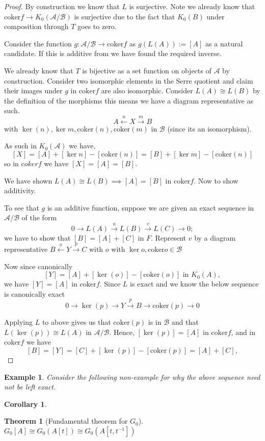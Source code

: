 \documentclass[12pt]{article}
\numberwithin{equation}{section}
\newcommand{\coker}{{\mathrm{coker}}}
\newcounter{dummy} \numberwithin{dummy}{section}
\newtheorem{theorem}[dummy]{Theorem}
\newtheorem{corollary}[dummy]{Corollary}
\newtheorem{example}[dummy]{Example}
\begin{document}
	\begin{proof}
		By construction we know that $L$ is surjective.
		Note we already know that $\mathrm{coker} f \to  K_0(\mathcal{A/B})$ is surjective due to the fact that $K_0(B) $ under composition through $T$ goes to zero.
		
		Consider the function $g:\mathcal{A/B} \to \mathrm{coker}f$ as $g(L(A)):=[A]$ as a natural candidate. If this is additive from we have found the required inverse.
		
		We already know that $T $ is bijective as a set function on objects of $\mathcal{A}$ by construction. Consider two isomorphic elements in the Serre quotient and claim their images under $g$ in $\mathrm{coker} f $ are also isomorphic. Consider $L(A) \cong L(B)$ by the definition of the morphisms this means we have a diagram representative as such.
		\[ A \xleftarrow{n} X \xrightarrow{m} B \] with $\ker(n), \ker{m}, \mathrm{coker} (n) , \mathrm{coker}(m)$ in $\mathcal{B}$ (since its an isomorphism).
		
			As such in $K_0(\mathcal{A})$ we have, $$[X]=[A]+[\ker n]-[\mathrm{coker}(n)]=[B]+[\ker m]- [\mathrm{coker}(n)]$$ so in $\mathrm coker f$ we have $[X] = [A]=[B]$.
			
		We have shown $L(A) \cong L(B) \implies [A]=[B]$ in $\mathrm{coker} f$. Now to show additivity.
		
		To see that \( g \) is an additive function, suppose we are given an exact sequence in \( \mathcal{A/B} \) of the form
		\[
		0 \rightarrow L(A) \xrightarrow{u	} L(B) \xrightarrow{v} L(C) \rightarrow 0;
		\]
		we have to show that \( [B] = [A] + [C] \) in \( F \). Represent \( v \) by a diagram representative \( B \xleftarrow{o} Y \xrightarrow{p}	 C \) with \( o \) with $\ker o , \coker o \in \mathcal{B}$
		
		Now since canonically
		\[
		[Y] = [A] + [\ker(o)] - [\coker(o)] \text{ in } K_0(A),
		\]
		we have \( [Y] = [A] \) in \( \coker f \). Since \( L \) is exact and we know the below sequence is canonically exact
		\[
		0 \rightarrow \ker(p) \rightarrow Y \xrightarrow{p} B \rightarrow \coker(p) \rightarrow 0	\]
	
		Applying $L $ to above gives us that \( \coker(p) \) is in \( \mathcal B \) and that \( L(\ker(p)) \cong L(A) \) in \( \mathcal{A/B} \). Hence, \( [\ker(p)] = [A] \) in \( \coker f \), and in \( \coker f \) we have
		\[
		[B] = [Y] = [C] + [\ker(p)] - [\coker(p)] = [A] + [C],
		\]
	\end{proof}
	\begin{example}
		Consider the following non-example for why the above sequence need not be left exact.
	\end{example}
	\begin{corollary}\label{localizationk0corrolary}
		
	\end{corollary}
	\begin{theorem}[Fundamental theorem for $G_0$]
		$G_0[A] \cong G_0(A[t]) \cong G_0(A[t,t^{-1}])$
	\end{theorem}
\end{document}
